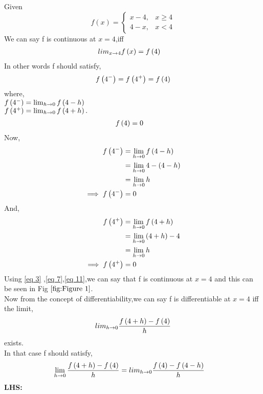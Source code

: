 \documentclass[journal,12pt,twocolumn]{IEEEtran}
\begin{document}
  Given  
            \begin{equation*} 
                 f(x)  = \begin{cases}
                              x - 4,  & x \geq 4 \\
                              4 - x , & x  <  4
                           \end{cases}
            \end{equation*}  
   We can say f is continuous at $x = 4$,iff 
            \begin{align}
                 lim_{x \to 4}f\left(x\right) &= f\left(4\right)
            \end{align}
    In other words f should satisfy,
            \begin{align}
                 f\left(4^-\right) =f\left(4^+\right) =f\left(4\right) 
            \end{align}
    where,\\ 
        $f\left(4^-\right) =  \lim_{h\to0}f\left(4-h\right)$\\
        $f\left(4^+\right) = \lim_{h\to0}f\left(4+h\right).$
            \begin{align}
                 f\left(4\right) &= 0\label{eq 3}
            \end{align}
    Now,
            \begin{align}
                 f\left(4^-\right)  &= \lim_{h\to0}f\left(4-h\right)\\
                                    &= \lim_{h\to0} 4 - \left(4-h\right)\\
                                    &= \lim_{h\to0} h\\
                 \implies f\left(4^-\right) &= 0\label{eq 7}
            \end{align}
    And,
            \begin{align}
                 f\left(4^+\right) &= \lim_{h\to0}f\left(4+h\right)\\
                                    &= \lim_{h\to0} \left(4+h\right)-4\\
                                    &= \lim_{h\to0} h \\
                 \implies f\left(4^+\right) &= 0\label{eq 11}
            \end{align}
    Using \eqref{eq 3} ,\eqref{eq 7},\eqref{eq 11},we can say that f is continuous at $ x = 4 $ and this can be seen in Fig $\ref{fig:Figure 1}$.\\
    Now from the concept of differentiability,we can say f is differentiable at $ x = 4 $ iff the limit,
             \[
                lim_{h \to 0}\frac{f\left(4 + h\right) - f\left(4\right)}{h}
             \] exists.\\
    In that case f should satisfy,
            \begin{align}
                 \lim_{h \to 0}\frac{f\brak{4 + h} - f\brak{4}}{h}  &=  lim_{h \to 0}\frac{f\brak{4} - f\brak{4-h}}{h}\label{eq 12} %
            \end{align}
 \textbf{LHS:}
\end{document}
